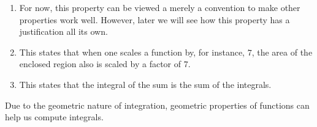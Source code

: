 \documentclass{ximera}
\begin{document}
\begin{theorem}
\begin{explanation}
\begin{enumerate}
\item For now, this property can be viewed a merely a convention to
  make other properties work well. However, later we will see how this
  property has a justification all its own.

\item This states that when one scales a function by, for instance, $7$,
  the area of the enclosed region also is scaled by a factor of
  $7$.
\item This states that the integral of the sum is the sum of the
  integrals.
\end{enumerate}
\end{explanation}
\end{theorem}

Due to the geometric nature of integration, geometric properties of
functions can help us compute integrals.
\end{document}
